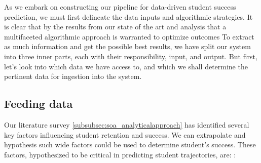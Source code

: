 \documentclass[../main.tex]{subfiles}
\begin{document}
As we embark on constructing our pipeline for data-driven student success prediction, we must first delineate the data inputs and algorithmic strategies. 
It is clear that by the results from our state of the art and analysis that a multifaceted algorithmic approach is warranted to optimize outcomes
To extract as much information and get the possible best results, we have split our system into three inner parts, each with their responsibility, input, and output.
But first, let's look into which data we have access to, and which we shall determine the pertinent data for ingestion into the system.

\subsection{Feeding data}
\label{subsec:conprop_feedingdata}
Our literature survey \ref{subsubsec:soa_analyticalapproach} has identified several key factors influencing student retention and success. We can extrapolate and hypothesis such wide factors could be used to determine student's success.
These factors, hypothesized to be critical in predicting student trajectories, are: \cite{opazo_analysis_2021,tinto_dropout_1975,caspersen_teachers_2015,lidia_problema_2006,bejarano_caso_2017,sinchi_acceso_2018,cavero_voluntad_2011,velasco_alisis_nodate}: 
\end{document}
